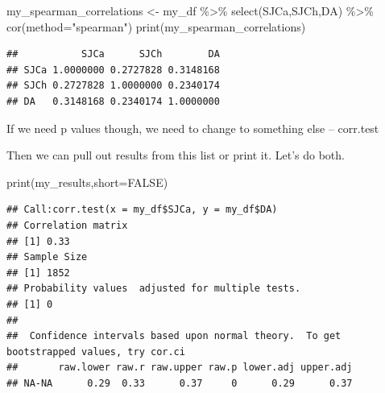 \documentclass[
]{book}
\newenvironment{Shaded}{\begin{snugshade}}{\end{snugshade}}
\newcommand{\AttributeTok}[1]{\textcolor[rgb]{0.77,0.63,0.00}{#1}}
\newcommand{\CommentTok}[1]{\textcolor[rgb]{0.56,0.35,0.01}{\textit{#1}}}
\newcommand{\ConstantTok}[1]{\textcolor[rgb]{0.00,0.00,0.00}{#1}}
\newcommand{\FunctionTok}[1]{\textcolor[rgb]{0.00,0.00,0.00}{#1}}
\newcommand{\NormalTok}[1]{#1}
\newcommand{\OtherTok}[1]{\textcolor[rgb]{0.56,0.35,0.01}{#1}}
\newcommand{\SpecialCharTok}[1]{\textcolor[rgb]{0.00,0.00,0.00}{#1}}
\newcommand{\StringTok}[1]{\textcolor[rgb]{0.31,0.60,0.02}{#1}}
\begin{document}
\begin{Shaded}
\begin{Highlighting}[]
\NormalTok{my\_spearman\_correlations }\OtherTok{\textless{}{-}}\NormalTok{ my\_df }\SpecialCharTok{\%\textgreater{}\%} \FunctionTok{select}\NormalTok{(SJCa,SJCh,DA) }\SpecialCharTok{\%\textgreater{}\%} \FunctionTok{cor}\NormalTok{(}\AttributeTok{method=}\StringTok{"spearman"}\NormalTok{)}
\FunctionTok{print}\NormalTok{(my\_spearman\_correlations)}
\end{Highlighting}
\end{Shaded}

\begin{verbatim}
##           SJCa      SJCh        DA
## SJCa 1.0000000 0.2727828 0.3148168
## SJCh 0.2727828 1.0000000 0.2340174
## DA   0.3148168 0.2340174 1.0000000
\end{verbatim}

If we need p values though, we need to change to something else -- corr.test

\begin{Shaded}
\end{Shaded}

Then we can pull out results from this list or print it. Let's do both.

\begin{Shaded}
\begin{Highlighting}[]
\FunctionTok{print}\NormalTok{(my\_results,}\AttributeTok{short=}\ConstantTok{FALSE}\NormalTok{)}
\end{Highlighting}
\end{Shaded}

\begin{verbatim}
## Call:corr.test(x = my_df$SJCa, y = my_df$DA)
## Correlation matrix 
## [1] 0.33
## Sample Size 
## [1] 1852
## Probability values  adjusted for multiple tests. 
## [1] 0
## 
##  Confidence intervals based upon normal theory.  To get bootstrapped values, try cor.ci
##       raw.lower raw.r raw.upper raw.p lower.adj upper.adj
## NA-NA      0.29  0.33      0.37     0      0.29      0.37
\end{verbatim}

\begin{Shaded}
\end{Shaded}
\end{document}
